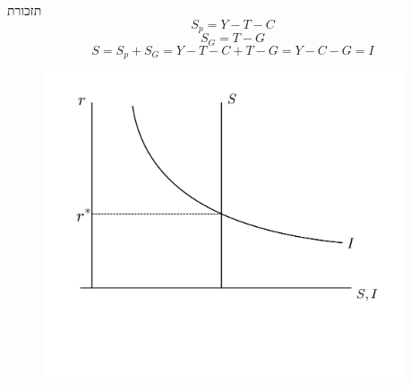 \documentclass[usenames,dvipsnames,10pt]{beamer}
\begin{document}
\begin{RTL}
\begin{frame}[allowframebreaks]
        \framebreak
        \begin{block}{תזכורת}
            $$S_p = Y - T - C$$
            $$S_G = T - G$$
            $$S = S_p + S_G = Y - T - C + T - G = Y - C - G = I$$
        \end{block}
        \begin{figure}
            \begin{small}
                \begin{center}
                    \includegraphics[width=0.95\textwidth]{WhatsApp Image 2024-02-10 at 23.34.52.jpeg}
                \end{center}
                \caption{}
                \label{fig:}
            \end{small}
        \end{figure}
        
    
    \end{frame}
\end{RTL}
\end{document}
